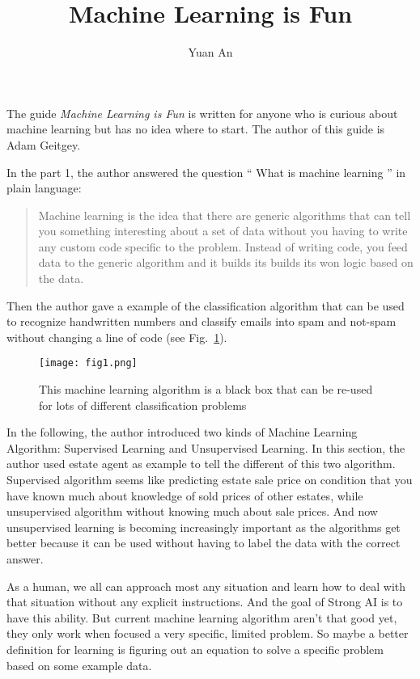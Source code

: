 \documentclass[a4paper,12pt,twocolumn]{article}
\title{Machine Learning is Fun}
\author{Yuan An}
\begin{document}
\maketitle

The guide \emph{Machine Learning is Fun}\cite{MLisFun} is written for anyone who is curious about machine learning but has no idea where to start. The author of this guide is Adam Geitgey.
\par
In the part 1, the author answered the question `` What is machine learning '' in plain language:
\begin{quote}
	Machine learning is the idea that there are generic algorithms that can tell you something interesting about a set of data without you having to write any custom code specific to the problem. Instead of writing code, you feed data to the generic algorithm and it builds its builds its won logic based on the data.
\end{quote}
\par
Then the author gave a example of the classification algorithm that can be used to recognize handwritten numbers and classify emails into spam and not-spam without changing a line of code (see Fig.~\ref{fig1}).
\begin{figure}[h]
	\centering
	\texttt{[image: fig1.png]}
	\caption{This machine learning algorithm is a black box that can be re-used for lots of different classification problems}
	\label{fig1}
\end{figure}
\par
In the following, the author introduced two kinds of Machine Learning Algorithm: Supervised Learning and Unsupervised Learning. In this section, the author used estate agent as example to tell the different of this two algorithm. Supervised algorithm seems like predicting estate sale price on condition that you have known much about knowledge of sold prices of other estates, while unsupervised algorithm without knowing much about sale prices. And now unsupervised learning is becoming increasingly important as the algorithms get better because it can be used without having to label the data with the correct answer.
\par
As a human, we all can approach most any situation and learn how to deal with that situation without any explicit instructions. And the goal of Strong AI is to have this ability. But current machine learning algorithm aren't that good yet, they only work when focused a very specific, limited problem. So maybe a better definition for learning is figuring out an equation to solve a specific problem based on some example data.
\end{document}
